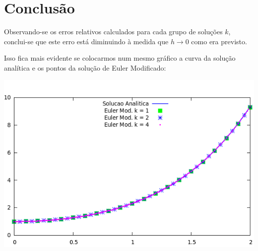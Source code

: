 \section{Conclusão}

Observando-se os erros relativos calculados para cada grupo de soluções $k$, conclui-se que
este erro está diminuindo à medida que $h \rightarrow 0$ como era previsto.

Isso fica mais evidente se colocarmos num mesmo gráfico a curva da solução analítica e os pontos da solução de Euler Modificado:

\includegraphics{graph.png}

